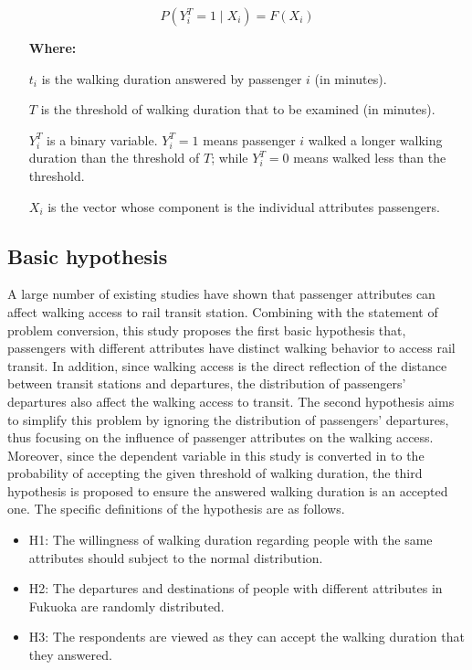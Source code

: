 \begin{equation}
P(Y^T_i=1 \mid X_i)=F(X_i)
\label{eq:chp2:probability}
\end{equation}

%
\begin{enumerate}
	\setlength{\parskip}{0\baselineskip} %
	\normalsize
	\item[\textbf{Where:}]
	\item[$t_i$] is the walking duration answered by passenger $i$ (in minutes).
	\item[$T$] is the threshold of walking duration that to be examined (in minutes).
	\item[$Y^T_i$] is a binary variable. $Y^T_i=1$ means passenger $i$ walked a longer walking duration than the threshold of $T$; while $Y^T_i=0$ means walked less than the threshold.
	\item[$X_i$] is the vector whose component is the individual attributes passengers.
	\setlength{\parskip}{0.7\baselineskip} %
\end{enumerate}


\subsection{Basic hypothesis}
A large number of existing studies have shown that passenger attributes can affect walking access to rail transit station. Combining with the statement of problem conversion, this study proposes the first basic hypothesis that, passengers with different attributes have distinct walking behavior to access rail transit. In addition, since walking access is the direct reflection of the distance between transit stations and departures, the distribution of passengers' departures also affect the walking access to transit. The second hypothesis aims to simplify this problem by ignoring the distribution of passengers' departures, thus focusing on the influence of passenger attributes on the walking access. Moreover, since the dependent variable in this study is converted in to the probability of accepting the given threshold of walking duration, the third hypothesis is proposed to ensure the answered walking duration is an accepted one. The specific definitions of the hypothesis are as follows.

\begin{itemize}
	\setlength{\parskip}{0\baselineskip} %
	\item H1: The willingness of walking duration regarding people with the same attributes should subject to the normal distribution.
	\item H2: The departures and destinations of people with different attributes in Fukuoka are randomly distributed.
	\item H3: The respondents are viewed as they can accept the walking duration that they answered.
	\setlength{\parskip}{0.7\baselineskip} %
\end{itemize}

